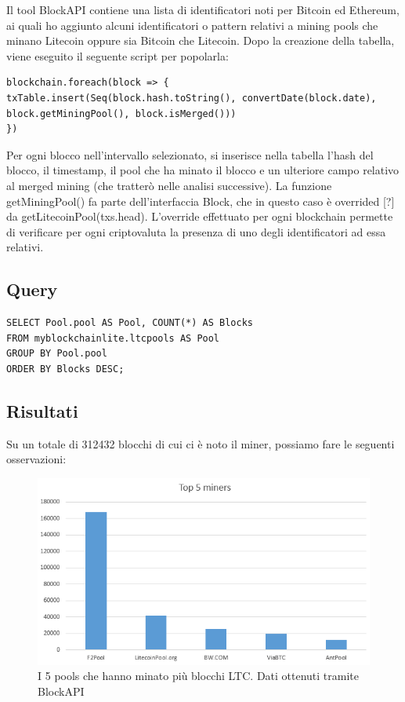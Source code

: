 Il tool BlockAPI contiene una lista di identificatori noti per Bitcoin ed Ethereum, ai quali ho aggiunto alcuni identificatori o pattern relativi a mining pools che minano Litecoin oppure sia Bitcoin che Litecoin. 
Dopo la creazione della tabella, viene eseguito il seguente script per popolarla:

\begin{lstlisting}
blockchain.foreach(block => {
txTable.insert(Seq(block.hash.toString(), convertDate(block.date), block.getMiningPool(), block.isMerged()))
})
\end{lstlisting}

Per ogni blocco nell’intervallo selezionato, si inserisce nella tabella l’hash del blocco, il timestamp, il pool che ha minato il blocco e un ulteriore campo relativo al merged mining (che tratterò nelle analisi successive). La funzione getMiningPool() fa parte dell’interfaccia Block, che in questo caso è overrided [?] da getLitecoinPool(txs.head). L’override effettuato per ogni blockchain permette di verificare per ogni criptovaluta la presenza di uno degli identificatori ad essa relativi.


\subsection{Query}

\begin{lstlisting}
SELECT Pool.pool AS Pool, COUNT(*) AS Blocks
FROM myblockchainlite.ltcpools AS Pool
GROUP BY Pool.pool
ORDER BY Blocks DESC;
\end{lstlisting}

\subsection{Risultati}

Su un totale di 312432 blocchi di cui ci è noto il miner, possiamo fare le seguenti osservazioni:

\begin{figure}[h!]
	\centering
	\includegraphics[width=1.0\linewidth]{images/top5miners}
	\caption{I 5 pools che hanno minato più blocchi LTC. Dati ottenuti tramite BlockAPI}
	\label{fig:top5miners}
\end{figure}


